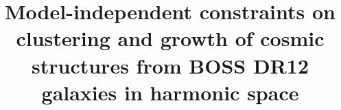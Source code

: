\documentclass[astrosymb,twocolumn]{aastex631}
\begin{document}
\title{Model-independent constraints on clustering and growth of cosmic structures from BOSS DR12 galaxies in harmonic space}


\end{document}
